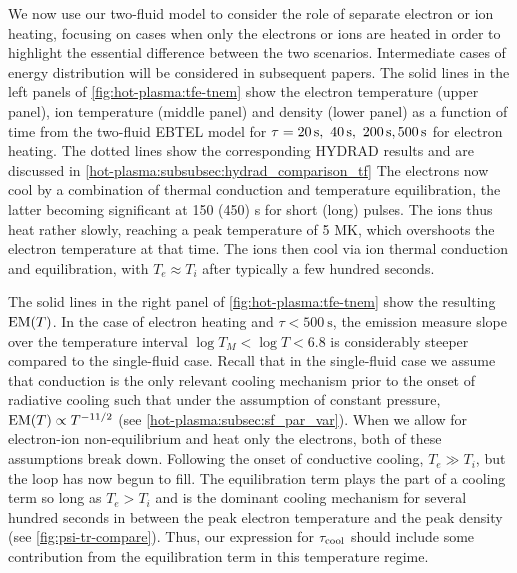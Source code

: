 We now use our two-fluid model to consider the role of separate electron or ion heating, focusing on cases when only the electrons or ions are heated in order to highlight the essential difference between the two scenarios. Intermediate cases of energy distribution will be considered in subsequent papers. The solid lines in the left panels of \autoref{fig:hot-plasma:tfe-tnem} show the electron temperature (upper panel), ion temperature (middle panel) and density (lower panel) as a function of time from the two-fluid EBTEL model for $\tau=\SIlist[list-final-separator = {,}]{20;40;200;500}{\second}$ for electron heating. The dotted lines show the corresponding HYDRAD results and are discussed in \autoref{hot-plasma:subsubsec:hydrad_comparison_tf} The electrons now cool by a combination of thermal conduction and temperature equilibration, the latter becoming significant at 150 (450) s for short (long) pulses. The ions thus heat rather slowly, reaching a peak temperature of 5 MK, which overshoots the electron temperature at that time. The ions then cool via ion thermal conduction and equilibration, with $T_e \approx T_i$ after typically a few hundred seconds.

The solid lines in the right panel of \autoref{fig:hot-plasma:tfe-tnem} show the resulting $\emd[T]$. In the case of electron heating and $\tau<\SI{500}{\second}$, the emission measure slope over the temperature interval $\log{T_M}<\log{T}<6.8$ is considerably steeper compared to the single-fluid case. Recall that in the single-fluid case we assume that conduction is the only relevant cooling mechanism prior to the onset of radiative cooling such that under the assumption of constant pressure, $\emd[T] \propto T^{-11/2}$ (see \autoref{hot-plasma:subsec:sf_par_var}). When we allow for electron-ion non-equilibrium and heat only the electrons, both of these assumptions break down. Following the onset of conductive cooling, $T_e \gg T_i$, but the loop has now begun to fill. The equilibration term plays the part of a cooling term so long as $T_e>T_i$ and is the dominant cooling mechanism for several hundred seconds in between the peak electron temperature and the peak density (see \autoref{fig:psi-tr-compare}). Thus, our expression for $\tau_\textup{cool}$ should include some contribution from the equilibration term in this temperature regime.

